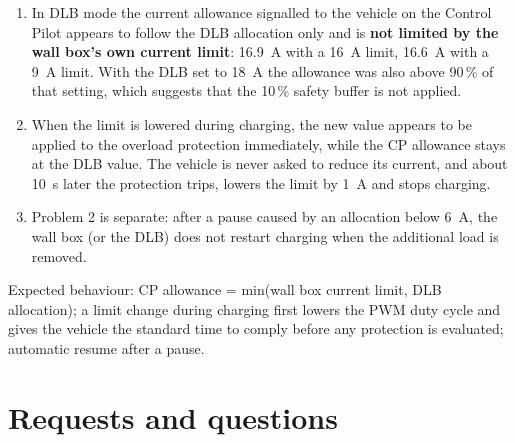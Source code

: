 \documentclass[11pt,a4paper]{article}
\begin{document}
\begin{enumerate}
\item In DLB mode the current allowance signalled to the vehicle on the Control Pilot appears to follow the DLB allocation only and is \textbf{not limited by the wall box's own current limit}: 16.9~A with a 16~A limit, 16.6~A with a 9~A limit. With the DLB set to 18~A the allowance was also above 90\,\% of that setting, which suggests that the 10\,\% safety buffer is not applied.
\item When the limit is lowered during charging, the new value appears to be applied to the overload protection immediately, while the CP allowance stays at the DLB value. The vehicle is never asked to reduce its current, and about 10~s later the protection trips, lowers the limit by 1~A and stops charging.
\item Problem 2 is separate: after a pause caused by an allocation below 6~A, the wall box (or the DLB) does not restart charging when the additional load is removed.
\end{enumerate}

Expected behaviour: CP allowance = min(wall box current limit, DLB allocation); a limit change during charging first lowers the PWM duty cycle and gives the vehicle the standard time to comply before any protection is evaluated; automatic resume after a pause.

\section{Requests and questions}
\end{document}
